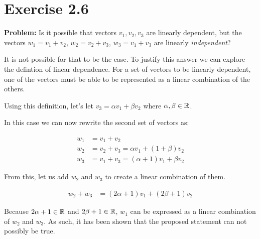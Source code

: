 \section*{Exercise 2.6}

\textbf{Problem:} Is it possible that vectors $v_{1}, v_{2}, v_{3}$ are linearly dependent, but the vectors $w_{1} = v_{1} + v_{2}$, $w_{2} = v_{2} + v_{3}$, $w_{3} = v_{1} + v_{3}$ are linearly \emph{independent}?

It is not possible for that to be the case. To justify this answer we can explore the defintion of linear dependence. For a set of vectors to be linearly dependent, one of the vectors must be able to be represented as a linear combination of the others.

Using this definition, let's let $v_3 = \alpha v_1 + \beta v_2$ where $\alpha, \beta \in \mathbb{R}$.

In this case we can now rewrite the second set of vectors as:

\[
	\begin{aligned}
		w_1 &= v_1 + v_2 \\
		w_2 &= v_2 + v_3 = \alpha v_1 + (1 + \beta) v_2 \\
		w_3 &= v_1 + v_3 = (\alpha + 1) v_1 + \beta v_2
	\end{aligned}
\]

From this, let us add $w_2$ and $w_3$ to create a linear combination of them.

\[
	\begin{aligned}
		w_2 + w_3 &= (2\alpha + 1)v_1 + (2\beta + 1)v_2
	\end{aligned}
\]

Because $2\alpha + 1 \in \mathbb{R}$ and $2\beta + 1 \in \mathbb{R}$, $w_1$ can be expressed as a linear combination of $w_2$ and $w_3$. As such, it has been shown that the proposed statement can not possibly be true. 

